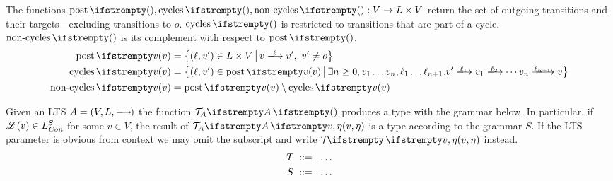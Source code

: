 \begin{definition}
  The functions $\NodePost{},\NodeCycles{},\NodeNonCycles{} : V \to L \times V$
  return the set of outgoing transitions and their targets---excluding
  transitions to $o$. $\NodeCycles{}$ is restricted to transitions that are
  part of a cycle. $\NodeNonCycles{}$ is its complement with respect to
  $\NodePost{}$.
  \begin{align*}
    \NodePost{v} &= \big\{
      (\ell, v') \in L \times V
      \,\big|\,
      v\sttrans\ell v',\ v' \ne o
    \big\} \\
    \NodeCycles{v} &= \big\{
      (\ell, v') \in \NodePost{v}
      \,\big|\,
      \exists n \geq 0, v_1 \dots v_n, \ell_1 \dots \ell_{n+1}.
        v'\sttrans{\ell_1} v_1\sttrans{\ell_2} \cdots v_n\sttrans{\ell_{n+1}} v
    \big\} \\
    \NodeNonCycles{v} &= \NodePost{v} \setminus \NodeCycles{v}\vphantom{\big\{}
  \end{align*}
\end{definition}

Given an LTS $A=\stlts$ the function $\stty[A]{}$ produces a type with the
grammar below. In particular, if $\mathscr{L}(v)\in L_{\textit{Con}}^S$ for some $v\in V$, the
result of $\stty[A]{v,\eta}$ is a type according to the grammar $S$. If the LTS
parameter is obvious from context we may omit the subscript and write
$\stty{v,\eta}$ instead.
%
\begin{align*}
  T &\; ::= \;\; \dots \\
  S &\; ::= \;\; \dots
\end{align*}
%

